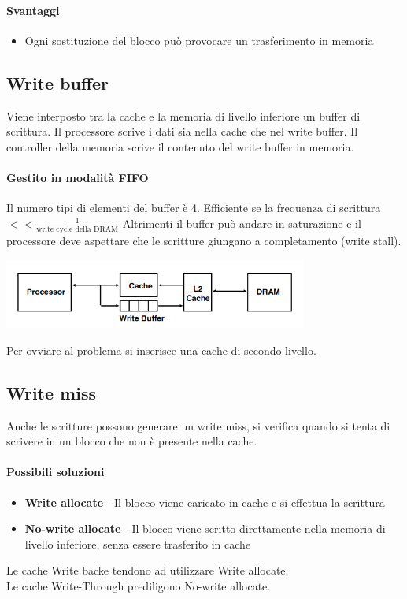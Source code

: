 \documentclass[12pt, a4paper, openany]{book}
\begin{document}
\paragraph*{Svantaggi}
\begin{itemize}
    \item Ogni sostituzione del blocco può provocare un trasferimento in memoria
\end{itemize}

\subsection*{Write buffer} Viene interposto tra la cache e la memoria di livello inferiore un
buffer di scrittura.
Il processore scrive i dati sia nella cache che nel write buffer. Il controller della memoria
scrive il contenuto del write buffer in memoria.
\paragraph*{Gestito in modalità FIFO} Il numero tipi di elementi del buffer è 4.
Efficiente se la frequenza di scrittura $<< \frac{1}{\mbox{write cycle della DRAM}}$
Altrimenti il buffer può andare in saturazione e il processore deve aspettare che le 
scritture giungano a completamento (write stall).
\begin{center}
    \includegraphics[width=100mm, scale=0.5]{Write buffer cache.png}
\end{center}
Per ovviare al problema si inserisce una cache di secondo livello.

\subsection{Write miss}
Anche le scritture possono generare un write miss, si verifica quando si tenta di scrivere
in un blocco che non è presente nella cache.
\paragraph*{Possibili soluzioni}
\begin{itemize}
    \item \textbf{Write allocate} - Il blocco viene caricato in cache e si effettua la scrittura
    \item \textbf{No-write allocate} - Il blocco viene scritto direttamente nella memoria di
    livello inferiore, senza essere trasferito in cache
\end{itemize}
Le cache Write backe tendono ad utilizzare Write allocate.
\\ Le cache Write-Through prediligono No-write allocate.
\end{document}
